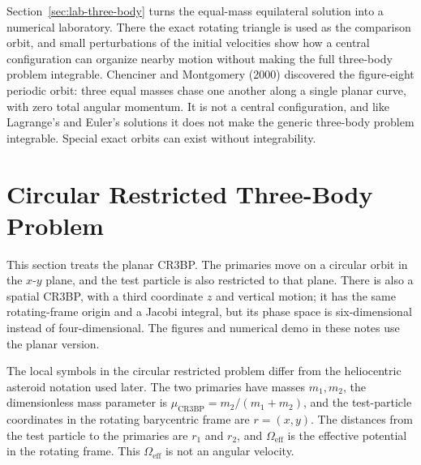 Section~\ref{sec:lab-three-body} turns the equal-mass equilateral solution into
a numerical laboratory. There the exact rotating triangle is used as the
comparison orbit, and small perturbations of the initial velocities show how a
central configuration can organize nearby motion without making the full
three-body problem integrable.
Chenciner and Montgomery (2000) discovered the figure-eight periodic orbit:
three equal masses chase one another along a single planar curve, with zero
total angular momentum. It is not a central configuration, and like Lagrange's
and Euler's solutions it does not make the generic three-body problem
integrable. Special exact orbits can exist without integrability.

\section{Circular Restricted Three-Body Problem}
\label{sec:circular-restricted-three-body-problem}

This section treats the planar CR3BP.  The primaries move on a circular orbit
in the \(x\)-\(y\) plane, and the test particle is also restricted to that
plane.  There is also a spatial CR3BP, with a third coordinate \(z\) and
vertical motion; it has the same rotating-frame origin and a Jacobi integral,
but its phase space is six-dimensional instead of four-dimensional.  The
figures and numerical demo in these notes use the planar version.

The local symbols in the circular restricted problem differ from the
heliocentric asteroid notation used later.  The two primaries have masses
\(m_1,m_2\), the dimensionless mass parameter is
\(\mu_{\mathrm{CR3BP}}=m_2/(m_1+m_2)\), and the test-particle coordinates in
the rotating barycentric frame are \(r=(x,y)\).  The distances from the test
particle to the primaries are \(r_1\) and \(r_2\), and
\(\Omega_{\mathrm{eff}}\) is the effective potential in the rotating frame.
This \(\Omega_{\mathrm{eff}}\) is not an angular velocity.

